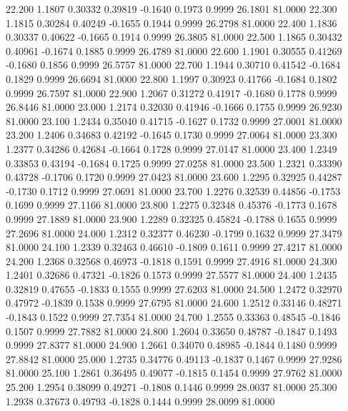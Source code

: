   22.200   1.1807   0.30332   0.39819  -0.1640   0.1973   0.9999  26.1801  81.0000
  22.300   1.1815   0.30284   0.40249  -0.1655   0.1944   0.9999  26.2798  81.0000
  22.400   1.1836   0.30337   0.40622  -0.1665   0.1914   0.9999  26.3805  81.0000
  22.500   1.1865   0.30432   0.40961  -0.1674   0.1885   0.9999  26.4789  81.0000
  22.600   1.1901   0.30555   0.41269  -0.1680   0.1856   0.9999  26.5757  81.0000
  22.700   1.1944   0.30710   0.41542  -0.1684   0.1829   0.9999  26.6694  81.0000
  22.800   1.1997   0.30923   0.41766  -0.1684   0.1802   0.9999  26.7597  81.0000
  22.900   1.2067   0.31272   0.41917  -0.1680   0.1778   0.9999  26.8446  81.0000
  23.000   1.2174   0.32030   0.41946  -0.1666   0.1755   0.9999  26.9230  81.0000
  23.100   1.2434   0.35040   0.41715  -0.1627   0.1732   0.9999  27.0001  81.0000
  23.200   1.2406   0.34683   0.42192  -0.1645   0.1730   0.9999  27.0064  81.0000
  23.300   1.2377   0.34286   0.42684  -0.1664   0.1728   0.9999  27.0147  81.0000
  23.400   1.2349   0.33853   0.43194  -0.1684   0.1725   0.9999  27.0258  81.0000
  23.500   1.2321   0.33390   0.43728  -0.1706   0.1720   0.9999  27.0423  81.0000
  23.600   1.2295   0.32925   0.44287  -0.1730   0.1712   0.9999  27.0691  81.0000
  23.700   1.2276   0.32539   0.44856  -0.1753   0.1699   0.9999  27.1166  81.0000
  23.800   1.2275   0.32348   0.45376  -0.1773   0.1678   0.9999  27.1889  81.0000
  23.900   1.2289   0.32325   0.45824  -0.1788   0.1655   0.9999  27.2696  81.0000
  24.000   1.2312   0.32377   0.46230  -0.1799   0.1632   0.9999  27.3479  81.0000
  24.100   1.2339   0.32463   0.46610  -0.1809   0.1611   0.9999  27.4217  81.0000
  24.200   1.2368   0.32568   0.46973  -0.1818   0.1591   0.9999  27.4916  81.0000
  24.300   1.2401   0.32686   0.47321  -0.1826   0.1573   0.9999  27.5577  81.0000
  24.400   1.2435   0.32819   0.47655  -0.1833   0.1555   0.9999  27.6203  81.0000
  24.500   1.2472   0.32970   0.47972  -0.1839   0.1538   0.9999  27.6795  81.0000
  24.600   1.2512   0.33146   0.48271  -0.1843   0.1522   0.9999  27.7354  81.0000
  24.700   1.2555   0.33363   0.48545  -0.1846   0.1507   0.9999  27.7882  81.0000
  24.800   1.2604   0.33650   0.48787  -0.1847   0.1493   0.9999  27.8377  81.0000
  24.900   1.2661   0.34070   0.48985  -0.1844   0.1480   0.9999  27.8842  81.0000
  25.000   1.2735   0.34776   0.49113  -0.1837   0.1467   0.9999  27.9286  81.0000
  25.100   1.2861   0.36495   0.49077  -0.1815   0.1454   0.9999  27.9762  81.0000
  25.200   1.2954   0.38099   0.49271  -0.1808   0.1446   0.9999  28.0037  81.0000
  25.300   1.2938   0.37673   0.49793  -0.1828   0.1444   0.9999  28.0099  81.0000
